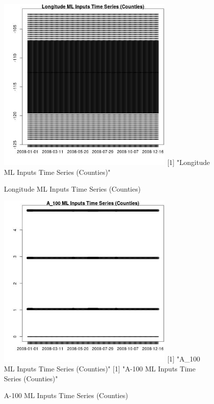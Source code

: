 \begin{figure} 
\centering  
\includegraphics[width=0.77\textwidth]{Code_Outputs/ML_input_report_ML_input_CountyGeometricCentroids_Locations_Dates_part_c_2008-01-01to2008-12-31_LongitudeTS.jpg} 
[1] "Longitude ML Inputs Time Series (Counties)"
\caption{\label{fig:ML_input_report_ML_input_CountyGeometricCentroids_Locations_Dates_part_c_2008-01-01to2008-12-31LongitudeTS}Longitude ML Inputs Time Series (Counties)} 
\end{figure} 
 

\begin{figure} 
\centering  
\includegraphics[width=0.77\textwidth]{Code_Outputs/ML_input_report_ML_input_CountyGeometricCentroids_Locations_Dates_part_c_2008-01-01to2008-12-31_A_100TS.jpg} 
[1] "A_100 ML Inputs Time Series (Counties)"
[1] "A-100 ML Inputs Time Series (Counties)"
\caption{\label{fig:ML_input_report_ML_input_CountyGeometricCentroids_Locations_Dates_part_c_2008-01-01to2008-12-31A_100TS}A-100 ML Inputs Time Series (Counties)} 
\end{figure} 
 

